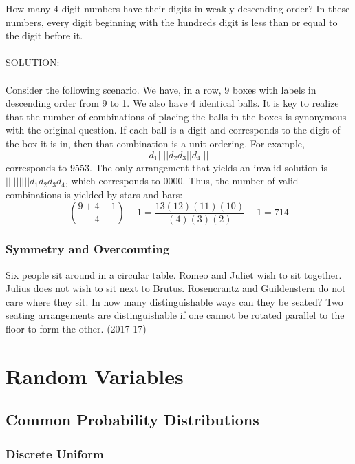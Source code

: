 \documentclass[12pt]{book}
\begin{document}
\begin{propc}
    How many 4-digit numbers have their digits in weakly descending order? In these numbers, every digit beginning with the hundreds digit is less than or equal to the digit before it.\\\\
    SOLUTION:\\\\
    Consider the following scenario. We have, in a row, 9 boxes with labels in descending order from 9 to 1. We also have 4 identical balls. It is key to realize that the number of combinations of placing the balls in the boxes is synonymous with the original question. If each ball is a digit and corresponds to the digit of the box it is in, then that combination is a unit ordering. For example, \[d_1||||d_2d_3||d_4|||\] corresponds to 9553. The only arrangement that yields an invalid solution is $|||||||||d_1d_2d_3d_4$, which corresponds to 0000. Thus, the number of valid combinations is yielded by stars and bars: \[\binom{9+4-1}{4}-1=\frac{13(12)(11)(10)}{(4)(3)(2)}-1=\boxed{714}\]
    
\end{propc}

\subsection{Symmetry and Overcounting}

\begin{propc}
    Six people sit around in a circular table. Romeo and Juliet wish to sit together. Julius does not wish to sit next to Brutus. Rosencrantz and Guildenstern do not care where they sit. In how many distinguishable ways can they be seated? Two seating arrangements are distinguishable if one cannot be rotated parallel to the floor to form the other. (2017 17)
\end{propc}

\chapter{Random Variables}

\section{Common Probability Distributions}

\subsection{Discrete Uniform}
\end{document}
